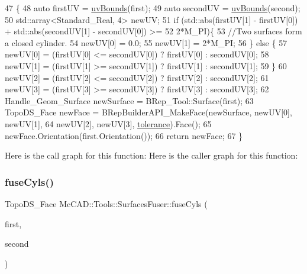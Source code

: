 \begin{DoxyCode}
47                                                                 \{
48     \textcolor{keyword}{auto} firstUV = \hyperlink{classMcCAD_1_1Tools_1_1SurfacesFuser_a5525c22611c4982eeded8b867928e2db}{uvBounds}(first);
49     \textcolor{keyword}{auto} secondUV = \hyperlink{classMcCAD_1_1Tools_1_1SurfacesFuser_a5525c22611c4982eeded8b867928e2db}{uvBounds}(second);
50     std::array<Standard\_Real, 4> newUV;
51     \textcolor{keywordflow}{if} (std::abs(firstUV[1] - firstUV[0]) + std::abs(secondUV[1] - secondUV[0]) >=
52             2*M\_PI)\{
53         \textcolor{comment}{//Two surfaces form a closed cylinder.}
54         newUV[0] = 0.0;
55         newUV[1] = 2*M\_PI;
56     \} \textcolor{keywordflow}{else} \{
57         newUV[0] = (firstUV[0] <= secondUV[0]) ? firstUV[0] : secondUV[0];
58         newUV[1] = (firstUV[1] >= secondUV[1]) ? firstUV[1] : secondUV[1];
59     \}
60     newUV[2] = (firstUV[2] <= secondUV[2]) ? firstUV[2] : secondUV[2];
61     newUV[3] = (firstUV[3] >= secondUV[3]) ? firstUV[3] : secondUV[3];
62     Handle\_Geom\_Surface newSurface = BRep\_Tool::Surface(first);
63     TopoDS\_Face newFace = BRepBuilderAPI\_MakeFace(newSurface, newUV[0], newUV[1],
64             newUV[2], newUV[3], \hyperlink{classMcCAD_1_1Tools_1_1SurfacesFuser_ad93b6c71e01c6b0692203d1671b7e8a4}{tolerance}).Face();
65     newFace.Orientation(first.Orientation());
66     \textcolor{keywordflow}{return} newFace;
67 \}
\end{DoxyCode}
Here is the call graph for this function\+:
Here is the caller graph for this function\+:
\mbox{\label{classMcCAD_1_1Tools_1_1SurfacesFuser_a803a59817fecd64ef1d8bf4a41c320ed}} 
\subsubsection{\texorpdfstring{fuse\+Cyls()}{fuseCyls()}\hspace{0.1cm}{\footnotesize\ttfamily [2/2]}}
{\footnotesize\ttfamily Topo\+D\+S\+\_\+\+Face Mc\+C\+A\+D\+::\+Tools\+::\+Surfaces\+Fuser\+::fuse\+Cyls (\begin{DoxyParamCaption}\item[{const Topo\+D\+S\+\_\+\+Face \&}]{first,  }\item[{const Topo\+D\+S\+\_\+\+Face \&}]{second }\end{DoxyParamCaption})\hspace{0.3cm}{\ttfamily [private]}}

